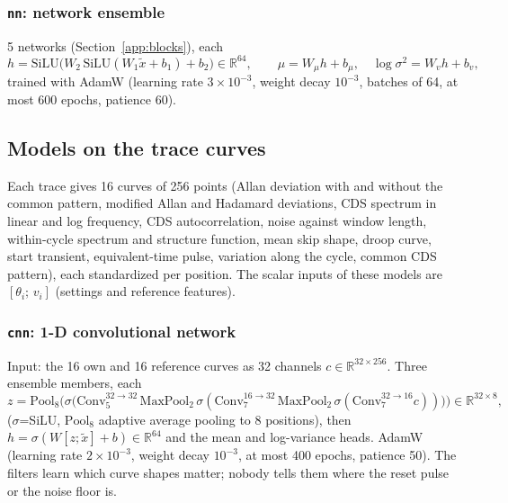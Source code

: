 \subsubsection{\texttt{nn}: network ensemble}
5 networks (Section~\ref{app:blocks}), each
\[
h=\mathrm{SiLU}\big(W_2\,\mathrm{SiLU}(W_1\tilde x+b_1)+b_2\big)\in\mathbb R^{64},\qquad \mu=W_\mu h+b_\mu,\quad \log\sigma^2=W_v h+b_v,
\]
trained with AdamW (learning rate $3\times10^{-3}$, weight decay $10^{-3}$, batches of 64, at most 600 epochs,
patience 60).


\subsection{Models on the trace curves}

Each trace gives 16 curves of 256 points (Allan deviation with and without the common pattern, modified Allan and Hadamard deviations, CDS spectrum in linear and
log frequency, CDS autocorrelation, noise against window length, within-cycle spectrum and structure function, mean
skip shape, droop curve, start transient, equivalent-time pulse, variation along the cycle, common CDS pattern), each
standardized per position. The scalar inputs of these models are $[\theta_i;\,v_i]$ (settings and reference features).

\subsubsection{\texttt{cnn}: 1-D convolutional network}
Input: the 16 own and 16 reference curves as 32 channels $c\in\mathbb R^{32\times256}$. Three ensemble members, each
\[
z=\mathrm{Pool}_8\Big(\sigma\big(\mathrm{Conv}_{5}^{32\to32}\,\mathrm{MaxPool}_2\,\sigma(\mathrm{Conv}_{7}^{16\to32}\,\mathrm{MaxPool}_2\,\sigma(\mathrm{Conv}_{7}^{32\to16}c))\big)\Big)\in\mathbb R^{32\times8},
\]
($\sigma$=SiLU, $\mathrm{Pool}_8$ adaptive average pooling to 8 positions), then $h=\sigma(W[z;\tilde x]+b)\in\mathbb
R^{64}$ and the mean and log-variance heads. AdamW (learning rate $2\times10^{-3}$, weight decay $10^{-3}$, at most 400
epochs, patience 50). The filters learn which curve shapes matter; nobody tells them where the reset pulse or the
noise floor is.


